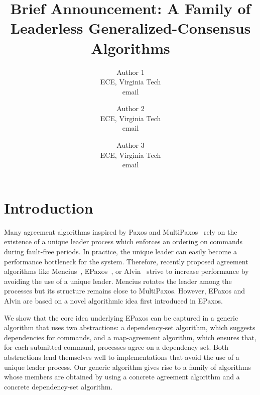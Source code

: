 

\title{\vspace{-0.8in}Brief Announcement: A Family of Leaderless Generalized-Consensus Algorithms}

\author{
Author 1\\
ECE, Virginia Tech\\
email
\and
Author 2\\
ECE, Virginia Tech\\
email
\and
Author 3\\
ECE, Virginia Tech\\
email
}

\date{}



\maketitle

%

\section{Introduction}

Many agreement algorithms inspired by Paxos and MultiPaxos~\cite{lamport2001paxos} rely on the existence of a unique leader process which enforces an ordering on commands during fault-free periods.
In practice, the unique leader can easily become a performance bottleneck for the system.
Therefore, recently proposed agreement algorithms like Mencius~\cite{MaoJunqueiraMarzullo08MenciusBuildingEfficientReplicatedStateMachine}, EPaxos~\cite{MoraruAndersenKaminsky13ThereIsMoreConsensusEgalitarianParliaments}, or Alvin~\cite{TurcuETAL14BeGeneralDontGiveUpConsistency} strive to increase performance by avoiding the use of a unique leader.
Mencius rotates the leader among the processes but its structure remains close to MultiPaxos. 
However, EPaxos and Alvin are based on a novel algorithmic idea first introduced in EPaxos.

We show that the core idea underlying EPaxos can be captured in a generic algorithm that uses two abstractions: a dependency-set algorithm, which suggests dependencies for commands, and a map-agreement algorithm, which ensures that, for each submitted command, processes agree on a dependency set. Both abstractions lend themselves well to implementations that avoid the use of a unique leader process.
Our generic algorithm gives rise to a family of algorithms whose members are obtained by using a concrete agreement algorithm and a concrete dependency-set algorithm. 

